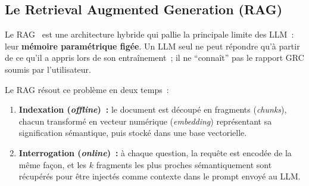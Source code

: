 \documentclass[a4paper,12pt,oneside]{report}
\begin{document}
	\subsection{Le Retrieval Augmented Generation (RAG)}
	
	Le RAG~\cite{lewis2020rag} est une architecture hybride
	qui pallie la principale limite des LLM~: leur \textbf{m\'emoire param\'etrique fig\'ee}.
	Un LLM seul ne peut r\'epondre qu'\`a partir de ce qu'il a appris lors de son
	entra\^inement~; il ne ``conna\^it'' pas le rapport GRC soumis par l'utilisateur.
	
	Le RAG r\'esout ce probl\`eme en deux temps~:
	
	\begin{enumerate}[leftmargin=1.5em,itemsep=6pt]
		\item \textbf{Indexation (\textit{offline})~:} le document est d\'ecoup\'e en
		fragments (\textit{chunks}), chacun transform\'e en vecteur num\'erique
		(\textit{embedding}) repr\'esentant sa signification s\'emantique, puis
		stock\'e dans une base vectorielle.
		\item \textbf{Interrogation (\textit{online})~:} \`a chaque question, la requ\^ete
		est encod\'ee de la m\^eme fa\c{c}on, et les $k$ fragments les plus proches
		s\'emantiquement sont r\'ecup\'er\'es pour \^etre inject\'es comme contexte
		dans le prompt envoy\'e au LLM.
	\end{enumerate}
	
\end{document}
